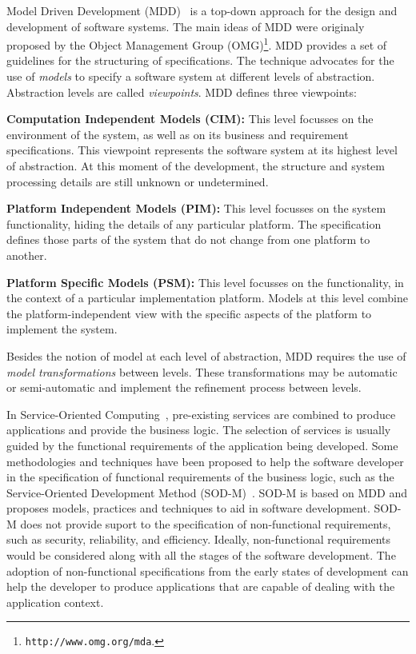 Model Driven Development (MDD)~\cite{Favre06arigorous} is a top-down approach for the design and development of software systems. 
The main ideas of MDD were originaly proposed by the Object Management Group
(OMG)\footnote{\texttt{http://www.omg.org/mda}.}. 
MDD provides a set of
guidelines for the structuring of specifications.
The technique advocates for the use of \textit{models} to specify a software system at different levels of abstraction.
Abstraction levels are called \textit{viewpoints}. 
MDD defines three viewpoints:

\begin{trivlist}
\item \textbf{Computation Independent Models (CIM):} This level focusses on the
environment of the system, as well as on its business and requirement specifications. 
This viewpoint represents the software system at its highest level of abstraction. 
At this moment of the development, the structure and system processing details are still unknown or undetermined. 
 
\item \textbf{Platform Independent Models (PIM):} This level focusses on the system functionality, hiding the details of any particular platform. 
The specification defines those parts of the system that do not change from one platform to another. 

\item \textbf{Platform Specific Models (PSM):} This level focusses on the functionality, in the context of a particular implementation platform.
Models at this level combine the platform-independent view with the specific aspects of the platform to implement the system.  
\end{trivlist}

Besides the notion of model at each level of abstraction, MDD requires the use of \textit{model transformations} between levels.
These transformations may be automatic or semi-automatic and implement the refinement process between levels.

\bigskip 

In Service-Oriented Computing~\cite{Papazoglou2007}, pre-existing services are
combined to produce applications and provide the business logic. The selection of services is usually guided by the functional requirements of the application being developed. 
Some methodologies and techniques have been proposed to help the software
developer in the specification of functional requirements of the business logic,
such as the Service-Oriented Development Method
(SOD-M)~\cite{decastro1}. 
SOD-M is based on MDD and proposes
models, practices and techniques to aid in software development. SOD-M does not
provide suport to the specification of non-functional requirements, such as
security, reliability, and efficiency. Ideally, non-functional requirements
would be considered along with all the stages of the software development. The
adoption of non-functional specifications from the early states of development
can help the developer to produce applications that are capable of dealing with
the application context.

